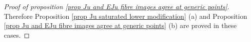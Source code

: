 \documentclass[10pt]{article}
\newcommand{\bangles}[1]{\left\langle #1 \right\rangle}
\newcommand{\stab}[2]{\mathrm{Stab}_{#1}(#2)}
\newcommand{\id}{\mathrm{id}}
\DeclareMathOperator{\Ind}{Ind}
\newcommand{\SL}{\mathrm{SL}}
\newcommand{\Gm}{{\mathbb{G}_\mathrm{m}}}
\newcommand{\Sn}{\mathfrak{S}}
\newcommand{\An}{\mathfrak{A}}
\theoremstyle{definition}
\theoremstyle{remark}
\newcommand{\Zur}{Z_{G^\vee}(u)^{\mathrm{red}}}
\begin{document}
\begin{proof}[Proof of proposition \ref{prop Ju and EJu fibre images agree at generic points}]
%
%


Therefore Proposition \ref{prop Ju saturated lower modification} (a) and Proposition \ref{prop Ju and EJu fibre images agree at generic points} (b) are proved in these cases.



\end{proof}
\end{document}
